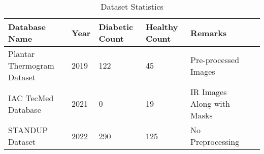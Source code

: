 \begin{table}[htbp]
\centering
\begin{tabularx}{\linewidth}{|X|X|X|X|X|X|}
    \hline
    \textbf{Database Name} &  \textbf{Year} & \textbf{Diabetic Count} & \textbf{Healthy Count} & \textbf{Remarks} \\ \hline
    Plantar Thermogram Dataset & 2019 & 122   &  45 & Pre-processed Images \\ \hline
    IAC TecMed Database        & 2021 & 0     &  19 & IR Images Along with Masks\\ \hline
    STANDUP Dataset            & 2022 & 290     &  125 & No Preprocessing\\ \hline
\end{tabularx}
\caption{Dataset Statistics}
\end{table}
